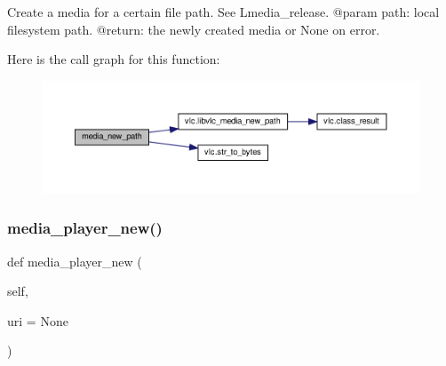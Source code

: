\begin{DoxyVerb}Create a media for a certain file path.
See L{media_release}.
@param path: local filesystem path.
@return: the newly created media or None on error.
\end{DoxyVerb}
 Here is the call graph for this function\+:
\nopagebreak
\begin{figure}[H]
\begin{center}
\leavevmode
\includegraphics[width=350pt]{classvlc_1_1_instance_aaecf944e5c0044478fbb6cfc8667c974_cgraph}
\end{center}
\end{figure}
\mbox{\label{classvlc_1_1_instance_a356a94c765e690cec25514e36101c6d7}} 
\subsubsection{\texorpdfstring{media\+\_\+player\+\_\+new()}{media\_player\_new()}}
{\footnotesize\ttfamily def media\+\_\+player\+\_\+new (\begin{DoxyParamCaption}\item[{}]{self,  }\item[{}]{uri = {\ttfamily None} }\end{DoxyParamCaption})}

